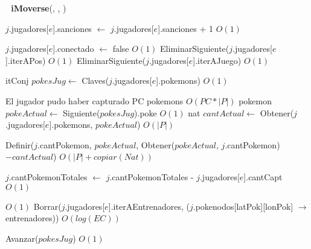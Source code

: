 \begin{Algoritmos}
\begin{algorithm}[H]
\begin{algorithmic}[1]
\end{algorithmic}
\end{algorithm}


$ $\newline
$ $\newline
{\textbf{iMoverse}(, , )}
\begin{algorithmic}[1]

  
  \State $j$.jugadores[$e$].sanciones $\gets$ $j$.jugadores[$e$].sanciones $+$ 1 \Comment $O(1)$
  
  
    \State $j$.jugadores[$e$].conectado $\gets$ false \Comment $O(1)$
    \State EliminarSiguiente($j$.jugadores[$e$].iterAPos) \Comment $O(1)$
    \State EliminarSiguiente($j$.jugadores[$e$].iterAJuego) \Comment $O(1)$
  
    \State itConj $pokesJug \gets$ Claves($j$.jugadores[$e$].pokemons) \Comment $O(1)$  
    
       \Comment El jugador pudo haber capturado PC pokemons $O(PC*|P|)$
      \State pokemon $pokeActual \gets$ Siguiente($pokesJug$).poke  \Comment $O(1)$
      \State nat $cantActual \gets$ Obtener($j$.jugadores[$e$].pokemons, $pokeActual$) \Comment $O(|P|)$
      
      \State Definir($j$.cantPokemon, $pokeActual$, Obtener($pokeActual$, $j$.cantPokemon)$-cantActual$) \Comment $O(|P| + copiar(Nat))$
    \EndWhile
    
    \State $j$.cantPokemonTotales $\gets$ $j$.cantPokemonTotales - $j$.jugadores[$e$].cantCapt \Comment $O(1)$
    
       \Comment $O(1)$
      \State Borrar($j$.jugadores[$e$].iterAEntrenadores, ($j$.pokenodos[latPok][lonPok] $\rightarrow$ entrenadores)) \Comment $O(log(EC))$
    \EndIf
    
    \State Avanzar($pokesJug$) \Comment $O(1)$

  \EndIf

\EndIf


  

\end{algorithmic}
\end{Algoritmos}
